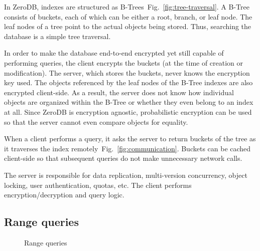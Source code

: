 \documentclass[notitlepage]{revtex4-1}
\newcommand{\figref}[1]{Fig.~\ref{#1}}
\begin{document}
In ZeroDB, indexes are structured as B-Trees~\figref{fig:tree-traversal}.
A B-Tree consists of buckets, each of which can be either a root, branch, or leaf node.
The leaf nodes of a tree point to the actual objects being stored.
Thus, searching the database is a simple tree traversal.

In order to make the database end-to-end encrypted yet still capable of performing queries, the client encrypts the buckets (at the time of creation or modification).
The server, which stores the buckets, never knows the encryption key used.
The objects referenced by the leaf nodes of the B-Tree indexes are also encrypted client-side.
As a result, the server does not know how individual objects are organized within the B-Tree or whether they even belong to an index at all.
Since ZeroDB is encryption agnostic, probabilistic encryption can be used so that the server cannot even compare objects for equality.

When a client performs a query, it asks the server to return buckets of the tree as it traverses the index remotely~\figref{fig:communication}.
Buckets can be cached client-side so that subsequent queries do not make unnecessary network calls.

The server is responsible for data replication, multi-version concurrency, object locking, user authentication, quotas, etc.
The client performs encryption/decryption and query logic.

\subsection{Range queries}

\begin{figure}
	\begin{center}
        \qquad
	\end{center}
	\caption{Range queries}
	\label{fig:range-query}
\end{figure}
\end{document}
